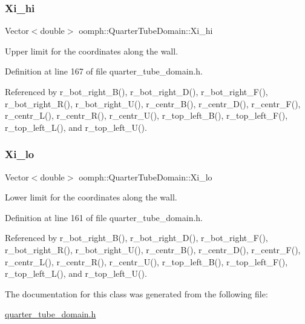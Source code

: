 \subsubsection{\texorpdfstring{Xi\+\_\+hi}{Xi\_hi}}
{\footnotesize\ttfamily Vector$<$double$>$ oomph\+::\+Quarter\+Tube\+Domain\+::\+Xi\+\_\+hi\hspace{0.3cm}{\ttfamily [private]}}



Upper limit for the coordinates along the wall. 



Definition at line 167 of file quarter\+\_\+tube\+\_\+domain.\+h.



Referenced by r\+\_\+bot\+\_\+right\+\_\+\+B(), r\+\_\+bot\+\_\+right\+\_\+\+D(), r\+\_\+bot\+\_\+right\+\_\+\+F(), r\+\_\+bot\+\_\+right\+\_\+\+R(), r\+\_\+bot\+\_\+right\+\_\+\+U(), r\+\_\+centr\+\_\+\+B(), r\+\_\+centr\+\_\+\+D(), r\+\_\+centr\+\_\+\+F(), r\+\_\+centr\+\_\+\+L(), r\+\_\+centr\+\_\+\+R(), r\+\_\+centr\+\_\+\+U(), r\+\_\+top\+\_\+left\+\_\+\+B(), r\+\_\+top\+\_\+left\+\_\+\+F(), r\+\_\+top\+\_\+left\+\_\+\+L(), and r\+\_\+top\+\_\+left\+\_\+\+U().

\mbox{\label{classoomph_1_1QuarterTubeDomain_a63fb621521e3e01a84ae393f73fc7117}} 
\subsubsection{\texorpdfstring{Xi\+\_\+lo}{Xi\_lo}}
{\footnotesize\ttfamily Vector$<$double$>$ oomph\+::\+Quarter\+Tube\+Domain\+::\+Xi\+\_\+lo\hspace{0.3cm}{\ttfamily [private]}}



Lower limit for the coordinates along the wall. 



Definition at line 161 of file quarter\+\_\+tube\+\_\+domain.\+h.



Referenced by r\+\_\+bot\+\_\+right\+\_\+\+B(), r\+\_\+bot\+\_\+right\+\_\+\+D(), r\+\_\+bot\+\_\+right\+\_\+\+F(), r\+\_\+bot\+\_\+right\+\_\+\+R(), r\+\_\+bot\+\_\+right\+\_\+\+U(), r\+\_\+centr\+\_\+\+B(), r\+\_\+centr\+\_\+\+D(), r\+\_\+centr\+\_\+\+F(), r\+\_\+centr\+\_\+\+L(), r\+\_\+centr\+\_\+\+R(), r\+\_\+centr\+\_\+\+U(), r\+\_\+top\+\_\+left\+\_\+\+B(), r\+\_\+top\+\_\+left\+\_\+\+F(), r\+\_\+top\+\_\+left\+\_\+\+L(), and r\+\_\+top\+\_\+left\+\_\+\+U().



The documentation for this class was generated from the following file\+:\begin{DoxyCompactItemize}
\item 
\hyperlink{quarter__tube__domain_8h}{quarter\+\_\+tube\+\_\+domain.\+h}\end{DoxyCompactItemize}
